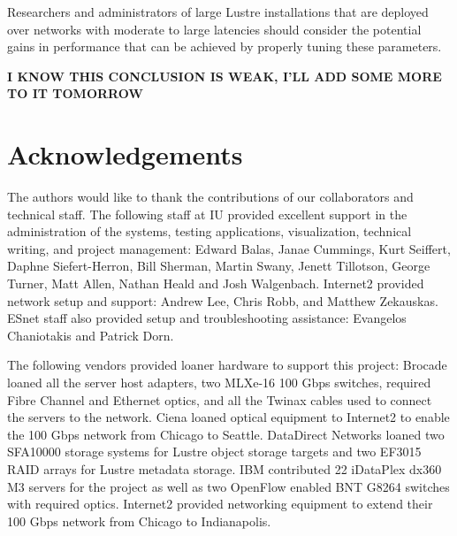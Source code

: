 \documentclass[]{sigplan-proc}
\begin{document}
Researchers and administrators of large Lustre installations that are deployed over networks with moderate to
large latencies should consider the potential gains in performance that can be achieved by properly tuning
these parameters.

{\bf I KNOW THIS CONCLUSION IS WEAK, I'LL ADD SOME MORE TO IT TOMORROW}
  
\section{Acknowledgements}

The authors would like to thank the contributions of our collaborators and technical staff. The following
staff at IU provided excellent support in the administration of the systems, testing applications,
visualization, technical writing, and project management: Edward Balas, Janae Cummings, Kurt Seiffert, Daphne
Siefert-Herron, Bill Sherman, Martin Swany, Jenett Tillotson, George Turner, Matt Allen, Nathan Heald and Josh Walgenbach. Internet2 provided network setup and support: Andrew Lee, Chris Robb, and Matthew Zekauskas. ESnet staff also provided setup and troubleshooting assistance: Evangelos Chaniotakis and Patrick Dorn.

The following vendors provided loaner hardware to support this project: Brocade loaned all the server host
adapters, two MLXe-16 100 Gbps switches, required Fibre Channel and Ethernet optics, and all the Twinax cables
used to connect the servers to the network. Ciena loaned optical equipment to Internet2 to enable the 100 Gbps
network from Chicago to Seattle. DataDirect Networks loaned two SFA10000 storage systems for Lustre object
storage targets and two EF3015 RAID arrays for Lustre metadata storage. IBM contributed 22 iDataPlex dx360 M3
servers for the project as well as two OpenFlow enabled BNT G8264 switches with required optics. Internet2
provided networking equipment to extend their 100 Gbps network from Chicago to Indianapolis.



\end{document}
